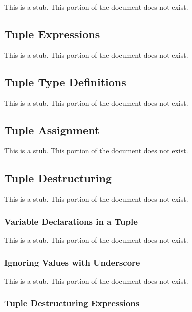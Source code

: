 \label{Tuples}

This is a stub.  This portion of the document does not exist.

\subsection{Tuple Expressions}
\label{Tuple_Expressions}

This is a stub.  This portion of the document does not exist.

\subsection{Tuple Type Definitions}
\label{Tuple_Type_Definitions}

This is a stub.  This portion of the document does not exist.

\subsection{Tuple Assignment}
\label{Tuple_Assignment}

This is a stub.  This portion of the document does not exist.

\subsection{Tuple Destructuring}
\label{Tuple_Destructuring}

This is a stub.  This portion of the document does not exist.

\subsubsection{Variable Declarations in a Tuple}
\label{Variable_Declarations_in_a_Tuple}

This is a stub.  This portion of the document does not exist.

\subsubsection{Ignoring Values with Underscore}
\label{Ignoring_Values_with_Underscore}

This is a stub.  This portion of the document does not exist.

\subsubsection{Tuple Destructuring Expressions}
\label{Tuple_Destructuring_Expressions}

